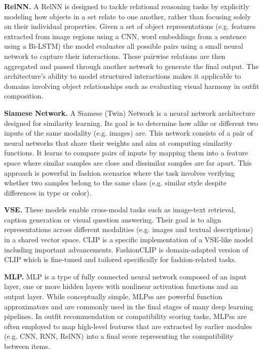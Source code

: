 \textbf{\ac{RelNN}.}
A \acs{RelNN} is designed to tackle relational reasoning tasks by explicitly modeling how objects in a set relate to one another, rather than focusing solely on their individual properties. Given a set of object representations (e.g. features extracted from image regions using a \acs{CNN}, word embeddings from a sentence using a \ac{Bi-LSTM}) the model evaluates all possible pairs using a small neural network to capture their interactions. These pairwise relations are then aggregated and passed through another network to generate the final output. The architecture's ability to model structured interactions makes it applicable to domains involving object relationships such as evaluating visual harmony in outfit composition. \cite[cf.]{sung_learning_2018}

\vspace{0.5cm}

\textbf{Siamese Network.}
A Siamese (Twin) Network is a neural network architecture designed for similarity learning. Its goal is to determine how alike or different two inputs of the same modality (e.g. images) are. This network consists of a pair of neural networks that share their weights and aim at computing similarity functions. It learns to compare pairs of inputs by mapping them into a feature space where similar samples are close and dissimilar samples are far apart. This approach is powerful in fashion scenarios where the task involves verifying whether two samples belong to the same class (e.g. similar style despite differences in type or color). \cite[cf.]{koch_siamese_2015}

\vspace{0.5cm}

\textbf{\ac{VSE}.}
These models enable cross-modal tasks such as image-text retrieval, caption generation or visual question answering. Their goal is to align representations across different modalities (e.g. images and textual descriptions) in a shared vector space. \acs{CLIP} is a specific implementation of a \acs{VSE}-like model including important advancements. Fashion\acs{CLIP} is domain-adapted version of \acs{CLIP} which is fine-tuned and tailored specifically for fashion-related tasks. \cite[cf.]{faghri_vse_2018}

\vspace{0.5cm}

\textbf{\ac{MLP}.}
\acs{MLP} is a type of fully connected neural network composed of an input layer, one or more hidden layers with nonlinear activation functions and an output layer. While conceptually simple, \acsp{MLPs} are powerful function approximators and are commonly used in the final stages of many deep learning pipelines. In outfit recommendation or compatibility scoring tasks, \acsp{MLPs} are often employed to map high-level features that are extracted by earlier modules (e.g. \acs{CNN}, \acs{RNN}, \acs{RelNN}) into a final score representing the compatibility between items. \cite[cf.]{upgrad_overview_2023}

